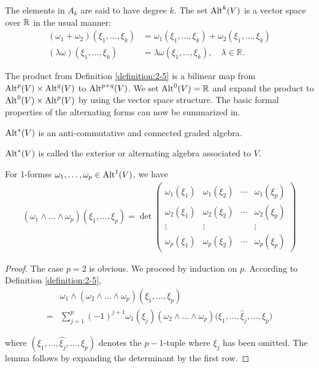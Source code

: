 The elements in $A_k$ are said to have degree $k$. The set $\operatorname{Alt}^k(V)$ is a vector space
over ${\mathbb{R}}$ in the usual manner:
\begin{align*}
  (\omega_1+\omega_2)(\xi_1,\dots,\xi_k) & = \omega_1(\xi_1,\dots,\xi_k)+\omega_2(\xi_1,\dots,\xi_k)\\
  (\lambda\omega)(\xi_1,\dots,\xi_k)     & = \lambda\omega(\xi_1,\dots,\xi_k),\quad\lambda\in\mathbb{R}. 
\end{align*}


The product from Definition \ref{definition:2-5} is a bilinear map from $\operatorname{Alt}^p(V)\times\operatorname{Alt}^q(V)$ to 
$\operatorname{Alt}^{p+q}(V)$. We set $\operatorname{Alt}^0(V)={\mathbb{R}}$ and expand the product to $\operatorname{Alt}^0(V)\times\operatorname{Alt}^p(V)$ by
using the vector space structure. The basic formal properties of the alternating forms can now be 
summarized in. 


\begin{theorem}\label{theorem:2-12}
  $\operatorname{Alt}^*(V)$ is an anti-commutative and connected graded algebra.
\end{theorem}

$\operatorname{Alt}^*(V)$ is called the exterior or alternating algebra associated to $V$.


\begin{lemma}\label{lemma:2-13}
  For 1-formss $\omega_1, \ldots, \omega_p\in\operatorname{Alt}^1(V)$, we have 
  \begin{align*}
    (\omega_1\wedge\dots\wedge\omega_p)(\xi_1,\dots,\xi_p)
    = \det
    \begin{pmatrix}
      \omega_1(\xi_1) & \omega_1(\xi_2) & \cdots & \omega_1(\xi_p)\\
      \omega_2(\xi_1) & \omega_2(\xi_2) & \cdots & \omega_2(\xi_p)\\
      \vdots          & \vdots          &        & \vdots\\
      \omega_p(\xi_1) & \omega_p(\xi_2) & \cdots & \omega_p(\xi_p)
    \end{pmatrix}
  \end{align*}
\end{lemma}

\begin{proof}
  The case $p=2$ is obvious. We proceed by induction on $p$. According to Definition \ref{definition:2-5},
  \begin{align*}
      & \omega_{1}\wedge(\omega_{2}\wedge\ldots\wedge\omega_{p})(\xi_{1},\ldots,\xi_{p})\\
    = & \sum_{j=1}^{p}(-1)^{j+1}\omega_{1}(\xi_{j})(\omega_{2}\wedge\ldots\wedge\omega_{p})
      \Big(\xi_{1},\ldots,\hat{\xi}_{j},\ldots,\xi_{p}\Big)
  \end{align*}

  where $(\xi_1, \ldots, \hat{\xi_j}, \ldots, \xi_p)$ denotes the $p-1$-tuple where 
  $\xi_j$ has been omitted. The lemma follows by expanding the determinant by the first row.
\end{proof}



